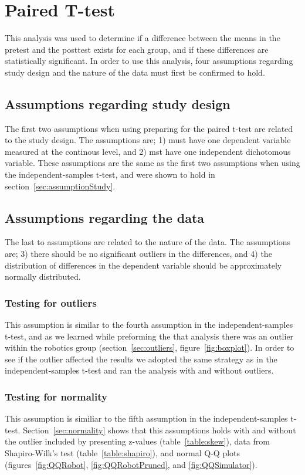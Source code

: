 \chapter{Paired T-test}\label{ch:pairedttest}
This analysis was used to determine if a difference between the means in the pretest and the posttest exists for each group, and if these differences are statistically significant. 
In order to use this analysis, four assumptions regarding study design and the nature of the data must first be confirmed to hold.

\section{Assumptions regarding study design}
The first two assumptions when using preparing for the paired t-test are related to the study design. The assumptions are;
1) must have one dependent variable measured at the continous level, and
2) mst have one independent dichotomous variable.
These assumptions are the same as the first two assumptions when using the independent-samples t-test, and were shown to hold in section~\ref{sec:assumptionStudy}. 

\section{Assumptions regarding the data}
The last to assumptions are related to the nature of the data. 
The assumptions are;
3) there should be no significant outliers in the differences, and
4) the distribution of differences in the dependent variable should be approximately normally distributed.

\subsection{Testing for outliers}
This assumption is similar to the fourth assumption in the independent-samples t-test, and as we learned while preforming the that analysis there was an outlier within the robotics group (section~\ref{sec:outliers}, figure~\ref{fig:boxplot}). In order to see if the outlier affected the results we adopted the same strategy as in the independent-samples t-test and ran the analysis with and without outliers.

\subsection{Testing for normality}
This assumption is similiar to the fifth assumption in the independent-samples t-test. Section~\ref{sec:normality} shows that this assumptions holds with and without the outlier included by presenting z-values (table~\ref{table:skew}), data from Shapiro-Wilk's test (table~\ref{table:shapiro}), and normal Q-Q plots (figures~\ref{fig:QQRobot}, \ref{fig:QQRobotPruned}, and \ref{fig:QQSimulator}).

